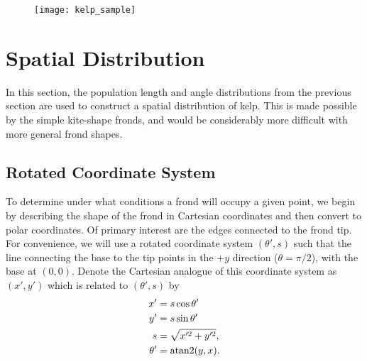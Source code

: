 \begin{figure}[h]
	\centering
	\texttt{[image: kelp\_sample]}
	\label{fig:kelp_sample}
\end{figure}

\section{Spatial Distribution}
In this section, the population length and angle distributions from the previous section are used to construct a spatial distribution of kelp.
This is made possible by the simple kite-shape fronds, and would be considerably more difficult with more general frond shapes.
\subsection{Rotated Coordinate System}
\label{sec:rot_coords}
To determine under what conditions a frond will occupy a given point, we begin by
describing the shape of the frond in Cartesian coordinates and then convert to polar coordinates.
Of primary interest are the edges connected to the frond tip.
For convenience, we will use a rotated coordinate system $(\theta',s)$ such that the line connecting the base to the tip points in the $+y$ direction ($\theta=\pi/2$), with the base at $(0,0)$.
Denote the Cartesian analogue of this coordinate system as $(x',y')$ which is related to $(\theta',s)$ by
\begin{align*}
	x' &= s\cos\theta' \\
	y' &= s\sin\theta' \\
	s &= \sqrt{x'^2+y'^2}, \\
	\theta' &= \operatorname{atan2}(y, x).
\end{align*}

